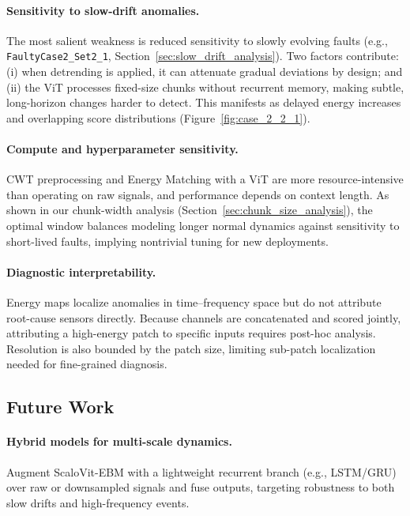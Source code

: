\documentclass{article}
\begin{document}
\paragraph{Sensitivity to slow-drift anomalies.}
The most salient weakness is reduced sensitivity to slowly evolving faults (e.g., \texttt{FaultyCase2\_Set2\_1}, Section~\ref{sec:slow_drift_analysis}). Two factors contribute: (i) when detrending is applied, it can attenuate gradual deviations by design; and (ii) the ViT processes fixed-size chunks without recurrent memory, making subtle, long-horizon changes harder to detect. This manifests as delayed energy increases and overlapping score distributions (Figure~\ref{fig:case_2_2_1}).

\paragraph{Compute and hyperparameter sensitivity.}
CWT preprocessing and Energy Matching with a ViT are more resource-intensive than operating on raw signals, and performance depends on context length. As shown in our chunk-width analysis (Section~\ref{sec:chunk_size_analysis}), the optimal window balances modeling longer normal dynamics against sensitivity to short-lived faults, implying nontrivial tuning for new deployments.

\paragraph{Diagnostic interpretability.}
Energy maps localize anomalies in time–frequency space but do not attribute root-cause sensors directly. Because channels are concatenated and scored jointly, attributing a high-energy patch to specific inputs requires post-hoc analysis. Resolution is also bounded by the patch size, limiting sub-patch localization needed for fine-grained diagnosis.

\subsection{Future Work}

\paragraph{Hybrid models for multi-scale dynamics.}
Augment ScaloVit-EBM with a lightweight recurrent branch (e.g., LSTM/GRU) over raw or downsampled signals and fuse outputs, targeting robustness to both slow drifts and high-frequency events.
\end{document}
